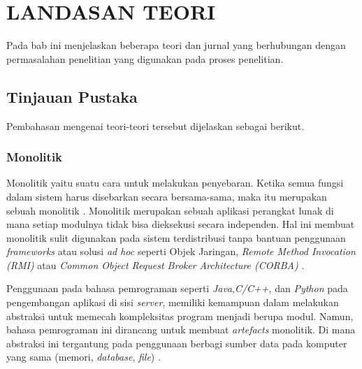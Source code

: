 \chapter{LANDASAN TEORI}
\vspace{4.5pt}
Pada bab ini menjelaskan beberapa teori dan jurnal yang berhubungan dengan permasalahan penelitian yang digunakan pada proses penelitian.
\section{Tinjauan Pustaka}
Pembahasan mengenai teori-teori tersebut dijelaskan sebagai berikut.
\subsection{Monolitik}
Monolitik yaitu suatu cara untuk melakukan penyebaran. Ketika semua fungsi dalam sistem harus disebarkan secara bersama-sama, maka itu merupakan sebuah monolitik \cite{74C}. Monolitik merupakan sebuah aplikasi perangkat lunak di mana setiap modulnya tidak bisa dieksekusi secara independen. Hal ini membuat monolitik sulit digunakan pada sistem terdistribusi tanpa bantuan penggunaan \textit{frameworks} atau solusi \textit{ad hoc} seperti Objek Jaringan, \textit{Remote Method Invocation (RMI)} atau \textit{
	Common Object Request Broker Architecture (CORBA)} \cite{0BD}.

Penggunaan pada bahasa pemrograman seperti \textit{Java},\textit{C/C++}, dan \textit{Python} pada pengembangan aplikasi di sisi \textit{server}, memiliki kemampuan dalam melakukan abstraksi untuk memecah kompleksitas program menjadi berupa modul. Namun, bahasa pemrograman ini dirancang untuk membuat \textit{artefacts} monolitik. Di mana abstraksi ini tergantung pada penggunaan berbagi sumber data pada komputer yang sama (memori, \textit{database}, \textit{file}) \cite{0BD}.


